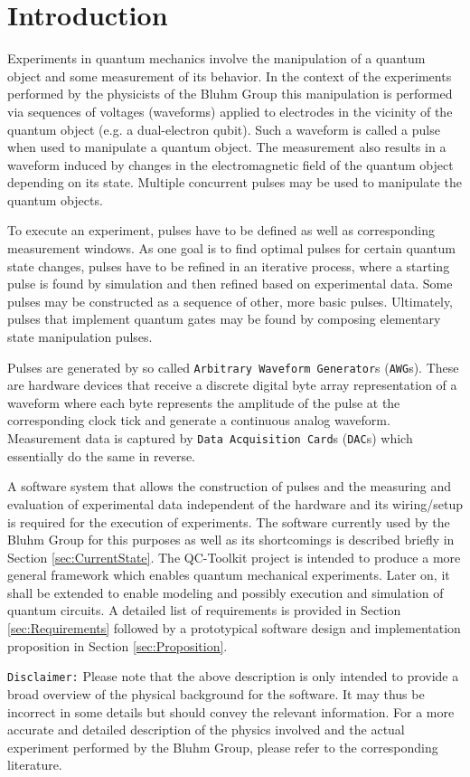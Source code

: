 \documentclass[a4paper,12pt]{article}
\begin{document}

\section{Introduction}
Experiments in quantum mechanics involve the manipulation of a quantum object and some measurement of its behavior. In the context of the experiments performed by the physicists of the Bluhm Group this manipulation is performed via sequences of voltages (waveforms) applied to electrodes in the vicinity of the quantum object (e.g. a dual-electron qubit). Such a waveform is called a pulse when used to manipulate a quantum object. The measurement also results in a waveform induced by changes in the electromagnetic field of the quantum object depending on its state. Multiple concurrent pulses may be used to manipulate the quantum objects.\par
To execute an experiment, pulses have to be defined as well as corresponding measurement windows. As one goal is to find optimal pulses for certain quantum state changes, pulses have to be refined in an iterative process, where a starting pulse is found by simulation and then refined based on experimental data. Some pulses may be constructed as a sequence of other, more basic pulses. Ultimately, pulses that implement quantum gates may be found by composing elementary state manipulation pulses.\par
Pulses are generated by so called \texttt{Arbitrary Waveform Generator}s (\texttt{AWG}s). These are hardware devices that receive a discrete digital byte array representation of a waveform where each byte represents the amplitude of the pulse at the corresponding clock tick and generate a continuous analog waveform. Measurement data is captured by \texttt{Data Acquisition Card}s (\texttt{DAC}s) which essentially do the same in reverse.\par
A software system that allows the construction of pulses and the measuring and evaluation of experimental data independent of the hardware and its wiring/setup is required for the execution of experiments. The software currently used by the Bluhm Group for this purposes as well as its shortcomings is described briefly in Section \ref{sec:CurrentState}. The QC-Toolkit project is intended to produce a more general framework which enables quantum mechanical experiments. Later on, it shall be extended to enable modeling and possibly execution and simulation of quantum circuits. A detailed list of requirements is provided in Section \ref{sec:Requirements} followed by a prototypical software design and implementation proposition in Section \ref{sec:Proposition}.\par
\texttt{Disclaimer:} Please note that the above description is only intended to provide a broad overview of the physical background for the software. It may thus be incorrect in some details but should convey the relevant information. For a more accurate and detailed description of the physics involved and the actual experiment performed by the Bluhm Group, please refer to the corresponding literature.
\end{document}
